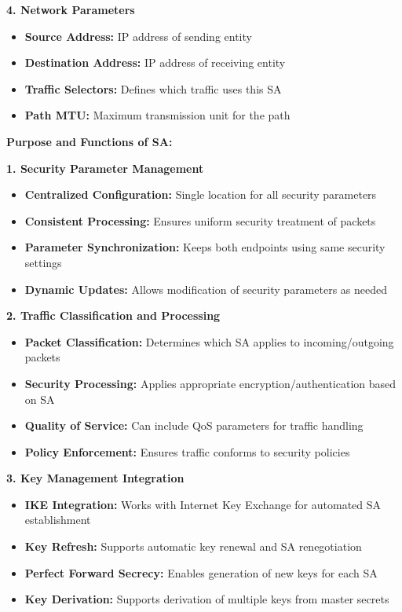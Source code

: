 \documentclass[12pt,a4paper]{article}
\begin{document}
\textbf{4. Network Parameters}
\begin{itemize}
    \item \textbf{Source Address:} IP address of sending entity
    \item \textbf{Destination Address:} IP address of receiving entity
    \item \textbf{Traffic Selectors:} Defines which traffic uses this SA
    \item \textbf{Path MTU:} Maximum transmission unit for the path
\end{itemize}

\textbf{Purpose and Functions of SA:}

\textbf{1. Security Parameter Management}
\begin{itemize}
    \item \textbf{Centralized Configuration:} Single location for all security parameters
    \item \textbf{Consistent Processing:} Ensures uniform security treatment of packets
    \item \textbf{Parameter Synchronization:} Keeps both endpoints using same security settings
    \item \textbf{Dynamic Updates:} Allows modification of security parameters as needed
\end{itemize}

\textbf{2. Traffic Classification and Processing}
\begin{itemize}
    \item \textbf{Packet Classification:} Determines which SA applies to incoming/outgoing packets
    \item \textbf{Security Processing:} Applies appropriate encryption/authentication based on SA
    \item \textbf{Quality of Service:} Can include QoS parameters for traffic handling
    \item \textbf{Policy Enforcement:} Ensures traffic conforms to security policies
\end{itemize}

\textbf{3. Key Management Integration}
\begin{itemize}
    \item \textbf{IKE Integration:} Works with Internet Key Exchange for automated SA establishment
    \item \textbf{Key Refresh:} Supports automatic key renewal and SA renegotiation
    \item \textbf{Perfect Forward Secrecy:} Enables generation of new keys for each SA
    \item \textbf{Key Derivation:} Supports derivation of multiple keys from master secrets
\end{itemize}
\end{document}
